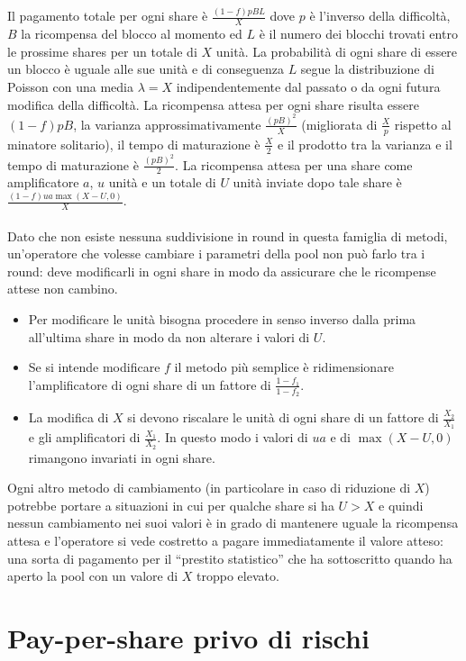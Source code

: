 Il pagamento totale per ogni share è $\frac{(1-f)pBL}{X}$ dove $p$ è l'inverso della difficoltà, $B$ la ricompensa del blocco al momento ed $L$ è il numero dei blocchi trovati entro le prossime shares per un totale di $X$ unità. La probabilità di ogni share di essere un blocco è uguale alle sue unità e di conseguenza $L$ segue la distribuzione di Poisson con una media $\lambda = X$ indipendentemente dal passato o da ogni futura modifica della difficoltà. La ricompensa attesa per ogni share risulta essere $(1-f)pB$, la varianza approssimativamente $\frac{(pB)^2}{X}$ (migliorata di $\frac{X}{p}$ rispetto al minatore solitario), il tempo di maturazione è $\frac{X}{2}$ e il prodotto tra la varianza e il tempo di maturazione è $\frac{(pB)^2}{2}$.
La ricompensa attesa per una share come amplificatore $a$, $u$ unità e un totale di $U$ unità inviate dopo tale share è $\frac{(1-f)ua\max(X-U,0)}{X}$.\\\\
Dato che non esiste nessuna suddivisione in round in questa famiglia di metodi, un'operatore che volesse cambiare i parametri della pool non può farlo tra i round: deve modificarli in ogni share in modo da assicurare che le ricompense attese non cambino.
\begin{itemize}
  \item Per modificare le unità bisogna procedere in senso inverso dalla prima all'ultima share in modo da non alterare i valori di $U$.
  \item Se si intende modificare $f$ il metodo più semplice è ridimensionare l'amplificatore di ogni share di un fattore di $\frac{1-f_1}{1-f_2}$.
  \item La modifica di $X$ si devono riscalare le unità di ogni share di un fattore di $\frac{X_2}{X_1}$ e gli amplificatori di $\frac{X_1}{X_2}$. In questo modo i valori di $ua$ e di $\max(X-U, 0)$ rimangono invariati in ogni share.
\end{itemize}
Ogni altro metodo di cambiamento (in particolare in caso di riduzione di $X$) potrebbe portare a situazioni in cui per qualche share si ha $U > X$ e quindi nessun cambiamento nei suoi valori è in grado di mantenere uguale la ricompensa attesa e l'operatore si vede costretto a pagare immediatamente il valore atteso: una sorta di pagamento per il ``prestito statistico'' che ha sottoscritto quando ha aperto la pool con un valore di $X$ troppo elevato.



\section{Pay-per-share privo di rischi}\label{pool-famiglia-mpps}

